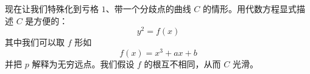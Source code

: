 \documentclass[11pt,a4paper]{article}
\begin{document}
现在让我们特殊化到亏格 $1$、带一个分歧点的曲线 $C$ 的情形。用代数方程显式描述 $C$ 是方便的：
\begin{equation}\tag{3.6}
y^2=f(x)
\end{equation}
其中我们可以取 $f$ 形如
\begin{equation}\tag{3.7}
f(x)=x^3+ax+b
\end{equation}
并把 $p$ 解释为无穷远点。我们假设 $f$ 的根互不相同，从而 $C$ 光滑。

\end{document}
